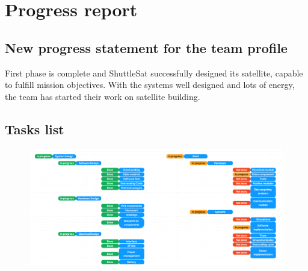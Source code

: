 \documentclass[11pt]{article}
\begin{document}


\tableofcontents
\pagestyle{plain}

\newpage





\section{Progress report}

\subsection{New progress statement for the team profile}
First phase is complete and ShuttleSat successfully designed its satellite, capable to fulfill mission objectives. With the systems well designed and lots of energy, the team has started their work on satellite building.

\subsection{Tasks list}
\begin{figure}[hbt!]
\includegraphics[width=15cm]{Tasks list.png}
\centering
\end{figure}
\end{document}
